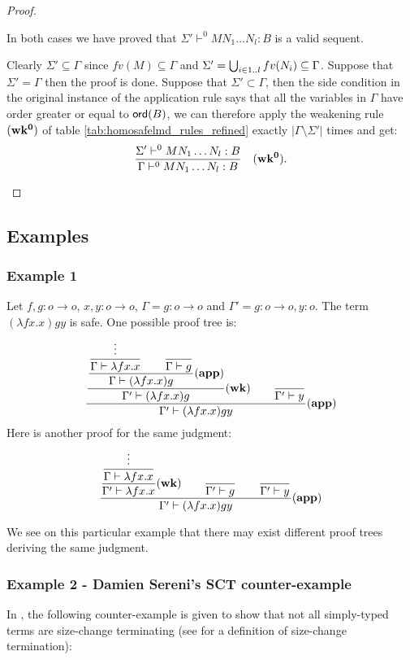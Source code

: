 \begin{proof}
\begin{itemize}
In both cases we have proved that $\Sigma'  \vdash^{0} M N_1 \ldots N_l : B$ is a valid sequent.

Clearly $\Sigma' \subseteq \Gamma$ since $fv(M) \subseteq \Gamma$ and $\Sigma' = \bigcup_{i\in1..l} fv(N_i) \subseteq \Gamma$.
Suppose that $\Sigma' = \Gamma$ then the proof is done.
Suppose that $\Sigma' \subset \Gamma$, then the side condition in the original instance of the application rule says that all
the variables in $\Gamma$ have order
greater or equal to ${\sf ord}(B)$, we can therefore apply the weakening rule $\mathbf{(wk^0)}$
of table \ref{tab:homosafelmd_rules_refined} exactly $|\Gamma\setminus \Sigma'|$ times and get:
$$ \frac{\displaystyle \Sigma'  \vdash^{0} M N_1 \ldots N_l : B}{\Gamma  \vdash^{0} M N_1 \ldots N_l : B} \quad
                                   \mathbf{(wk^0)}.
$$


\end{itemize}
\end{proof}


\subsection{Examples}
\subsubsection{Example 1}
Let $f,g:o\rightarrow o$, $x,y:o\rightarrow o$, $\Gamma =
g:o\rightarrow o$ and $\Gamma' = g:o\rightarrow o, y:o$. The term
$(\lambda f x . x) g y $ is safe. One possible proof tree is:
$$ \frac{\displaystyle 
        \frac{\displaystyle 
            \frac{\displaystyle 
                \frac{\displaystyle \vdots}{\Gamma \vdash \lambda f x. x}      \qquad \frac{\displaystyle}{\Gamma \vdash g} }{\Gamma \vdash (\lambda f x. x) g} \mathbf{(app)}
        }{ \Gamma' \vdash (\lambda f x. x) g } \mathbf{(wk)}
        \qquad \frac{\displaystyle}{\Gamma' \vdash y}
    }{ \Gamma' \vdash (\lambda f x. x) g y } \mathbf{(app)}
$$
Here is another proof for the same judgment:
$$ \frac{\displaystyle   \frac{\displaystyle  \frac{\displaystyle \vdots}{\Gamma \vdash \lambda f x. x} }{\Gamma' \vdash \lambda f x. x} \mathbf{(wk)}    \qquad \frac{\displaystyle }{\Gamma' \vdash g} \qquad \frac{\displaystyle }{\Gamma' \vdash y}}{\Gamma' \vdash (\lambda f x. x) g y } \mathbf{(app)}$$

We see on this particular example that there may exist different
proof trees deriving the same judgment.

\subsubsection{Example 2 - Damien Sereni's SCT counter-example}
In \cite{serenistypesct05}, the following counter-example is given
to show that not all simply-typed terms are size-change terminating
(see \cite{jones01} for a definition of size-change termination):

